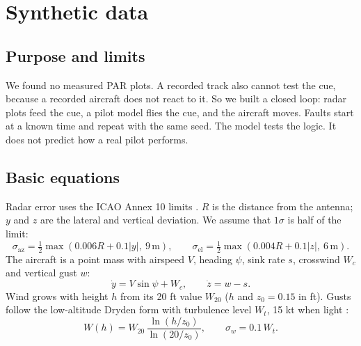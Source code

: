 \documentclass{ideathon2026}
\begin{document}
\section{Synthetic data}
\subsection{Purpose and limits}
We found no measured PAR plots. A recorded track also cannot test the cue, because a recorded aircraft does not react to it.
So we built a closed loop: radar plots feed the cue, a pilot model flies the cue, and the aircraft moves. Faults start at a
known time and repeat with the same seed. The model tests the logic. It does not predict how a real pilot performs.

\subsection{Basic equations}
Radar error uses the ICAO Annex 10 limits \cite{icao10}. $R$ is the distance from the antenna; $y$ and $z$ are the lateral and
vertical deviation. We assume that $1\sigma$ is half of the limit:
\begin{equation}
\sigma_{\mathrm{az}} = \tfrac12\max(0.006R + 0.1|y|,\ 9\,\mathrm{m}),\qquad
\sigma_{\mathrm{el}} = \tfrac12\max(0.004R + 0.1|z|,\ 6\,\mathrm{m}).
\end{equation}
The aircraft is a point mass with airspeed $V$, heading $\psi$, sink rate $s$, crosswind $W_c$ and vertical gust $w$:
\begin{equation}
\dot y = V\sin\psi + W_c,\qquad \dot z = w - s.
\end{equation}
Wind grows with height $h$ from its 20 ft value $W_{20}$ ($h$ and $z_0 = 0.15$ in ft). Gusts follow the low-altitude Dryden form
with turbulence level $W_t$, 15 kt when light \cite{dryden,shear}:
\begin{equation}
W(h) = W_{20}\,\frac{\ln(h/z_0)}{\ln(20/z_0)},\qquad \sigma_w = 0.1\,W_t.
\end{equation}
\end{document}
